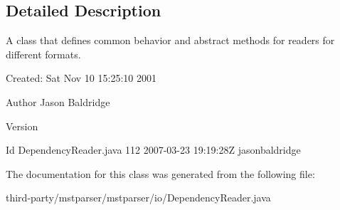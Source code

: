 \subsection{Detailed Description}
A class that defines common behavior and abstract methods for readers for different formats.

Created: Sat Nov 10 15:25:10 2001 

\begin{DoxyAuthor}{Author}
Jason Baldridge 
\end{DoxyAuthor}
\begin{DoxyVersion}{Version}

\end{DoxyVersion}
\begin{DoxyParagraph}{Id}
DependencyReader.java 112 2007-\/03-\/23 19:19:28Z jasonbaldridge 
\end{DoxyParagraph}


The documentation for this class was generated from the following file:\begin{DoxyCompactItemize}
\item 
third-\/party/mstparser/mstparser/io/DependencyReader.java\end{DoxyCompactItemize}
